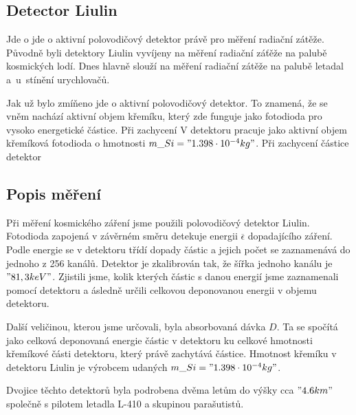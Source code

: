 \documentclass[12pt,a4paper]{article}
\begin{document}
\subsection*{Detector Liulin}
Jde o jde o aktivní polovodičový detektor právě pro měření radiační zátěže.
Původně byli detektory Liulin vyvíjeny na měření radiační záťěže na palubě
kosmických lodí. Dnes hlavně slouží na měření radiační zátěže na palubě letadal
a~u~stínění urychlovačů.\par Jak už bylo zmíňeno jde o aktivní polovodičový
detektor. To znamená, že se vněm nachází aktivní objem křemíku, který zde
funguje jako fotodioda pro vysoko energetické částice. Při zachycení %
V detektoru pracuje jako aktivní objem křemíková fotodioda o hmotnosti
$m\_{Si}="1.398\cdot 10^{-4} kg"$. Při zachycení částice detektor
\subsection*{Popis měření}
Při měření kosmického záření jsme použili polovodičový detektor Liulin. Fotodioda zapojená v závěrném směru
detekuje energii $ \overline{\epsilon} $ dopadajícího záření. Podle energie se v detektoru třídí dopady
částic a jejich počet se zaznamenává do jednoho z 256 kanálů. Detektor je zkalibrován tak, že šířka jednoho
kanálu je $"81,3 keV"$. Zjistili jsme, kolik kterých částic s danou energií jsme zaznamenali pomocí detektoru a
ásledně určili celkovou deponovanou energii v objemu detektoru.\par
Další veličinou, kterou jsme určovali, byla absorbovaná dávka $D$. Ta se spočítá jako celková deponovaná
energie částic v detektoru ku celkové hmotnosti křemíkové části detektoru, který právě zachytává částice.
Hmotnost křemíku v detektoru Liulin je výrobcem udaných $m\_{Si}="1.398\cdot 10^{-4} kg"$.\par
Dvojice těchto detektorů byla podrobena dvěma letům do výšky cca $"4.6 km"$ společně s pilotem letadla
L-410 a skupinou parašutistů.
\end{document}
